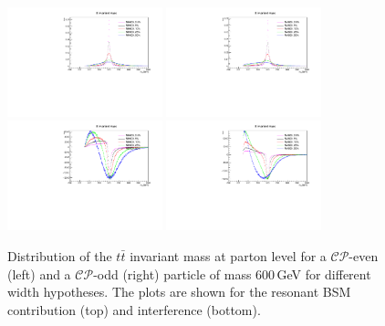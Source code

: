 \begin{figure} \centering
  \includegraphics[width=0.4\textwidth]{fig/chapt4/gen_plots/H_res_ljets_M600.pdf}
  \includegraphics[width=0.4\textwidth]{fig/chapt4/gen_plots/A_res_ljets_M600.pdf}\\
  \includegraphics[width=0.4\textwidth]{fig/chapt4/gen_plots/H_int_ljets_M600.pdf}
  \includegraphics[width=0.4\textwidth]{fig/chapt4/gen_plots/A_int_ljets_M600.pdf}\\
  \caption{Distribution of the $t\bar t$ invariant mass at parton level for a $\mathcal{CP}$-even (left) and a $\mathcal{CP}$-odd (right) particle of mass 600\,GeV for different width hypotheses. The plots are shown for the resonant BSM contribution (top) and interference (bottom).}
  \label{fig:mtt_gen_600}
\end{figure}

